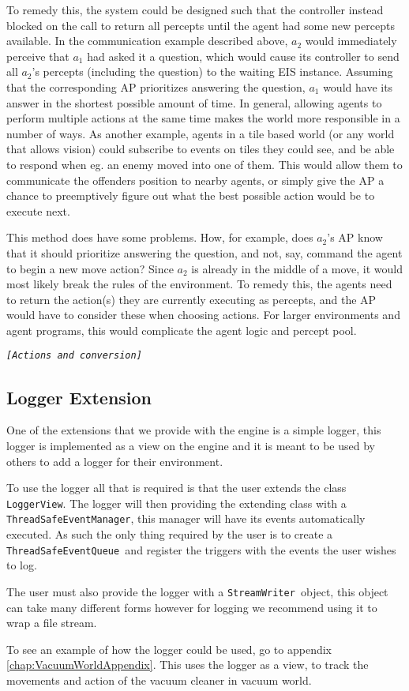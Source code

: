 To remedy this, the system could be designed such that the controller
instead blocked on the call to return all percepts until the agent
had some new percepts available. In the communication example described
above, $a_{2}$ would immediately perceive that $a_{1}$ had asked
it a question, which would cause its controller to send all $a_{2}$'s
percepts (including the question) to the waiting EIS instance. Assuming
that the corresponding AP prioritizes answering the question, $a_{1}$
would have its answer in the shortest possible amount of time. In
general, allowing agents to perform multiple actions at the same time
makes the world more responsible in a number of ways. As another example,
agents in a tile based world (or any world that allows vision) could
subscribe to events on tiles they could see, and be able to respond
when eg. an enemy moved into one of them. This would allow them to
communicate the offenders position to nearby agents, or simply give
the AP a chance to preemptively figure out what the best possible
action would be to execute next.

This method does have some problems. How, for example, does $a_{2}$'s
AP know that it should prioritize answering the question, and not,
say, command the agent to begin a new move action? Since $a_{2}$
is already in the middle of a move, it would most likely break the
rules of the environment. To remedy this, the agents need to return
the action(s) they are currently executing as percepts, and the AP
would have to consider these when choosing actions. For larger environments
and agent programs, this would complicate the agent logic and percept
pool.

\texttt{\emph{{[}Actions and conversion{]}}}


\subsection{Logger Extension}

One of the extensions that we provide with the engine is a simple
logger, this logger is implemented as a view on the engine and it
is meant to be used by others to add a logger for their environment.

To use the logger all that is required is that the user extends the
class \texttt{LoggerView}. The logger will then providing the extending
class with a \texttt{ThreadSafeEventManager}, this manager will have
its events automatically executed. As such the only thing required
by the user is to create a \texttt{ThreadSafeEventQueue }and register
the triggers with the events the user wishes to log.

The user must also provide the logger with a \texttt{StreamWriter
}object, this object can take many different forms however for logging
we recommend using it to wrap a file stream. 

To see an example of how the logger could be used, go to appendix
\ref{chap:VacuumWorldAppendix}. This uses the logger as a view, to
track the movements and action of the vacuum cleaner in vacuum world.
